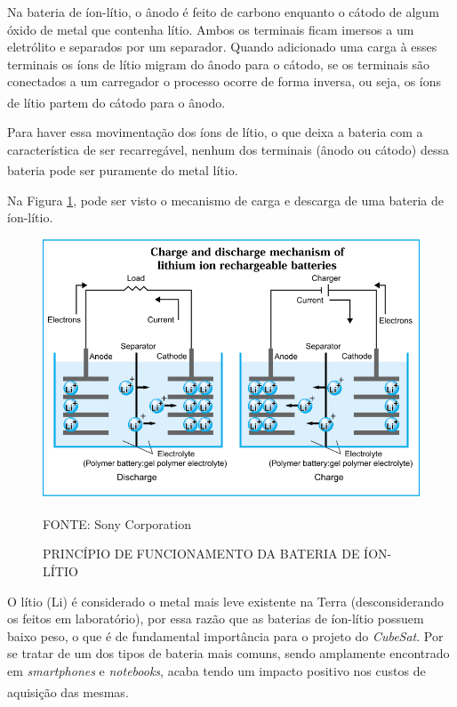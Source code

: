 \documentclass[
	12pt,				%
	openright,			%
	oneside,			%
	a4paper,			%
	english,			%
	french,				%
	spanish,			%
	brazil,				%
	oldfontcommands
	]{abntex2}
\begin{document}
	Na bateria de íon-lítio, o ânodo é feito de carbono enquanto o cátodo de algum óxido de metal que contenha lítio. Ambos os terminais ficam imersos a um eletrólito e separados por um separador. Quando adicionado uma carga à esses terminais os íons de lítio migram do ânodo para o cátodo, se os terminais são conectados a um carregador o processo ocorre de forma inversa,  ou seja, os íons de lítio partem do cátodo para o ânodo.\textsuperscript{\cite{sony}}
	
	Para haver essa movimentação dos íons de lítio, o que deixa a bateria com a característica de ser recarregável, nenhum dos terminais (ânodo ou cátodo) dessa bateria pode ser puramente do metal lítio.\textsuperscript{\cite{sony}}
	
	Na Figura \ref{Fig_PF_Bat}, pode ser visto o mecanismo de carga e descarga de uma bateria de íon-lítio.
	
	\begin{figure}[th]
		\caption{PRINCÍPIO DE FUNCIONAMENTO DA BATERIA DE ÍON-LÍTIO}
		\label{Fig_PF_Bat}
		\centering
		\includegraphics[width=0.8\linewidth]{./figs/funcionamento_bateria}
			
		\begin{small}
			FONTE: Sony Corporation\textsuperscript{\cite{sony}}
		\end{small}		
	\end{figure}
	\pagebreak
	O lítio (Li) é considerado o metal mais leve existente na Terra (desconsiderando os feitos em laboratório), por essa razão que as baterias de íon-lítio possuem baixo peso, o que é de fundamental importância para o projeto do \textit{CubeSat}. Por se tratar de um dos tipos de bateria mais comuns, sendo amplamente encontrado em \textit{smartphones} e \textit{notebooks}, acaba tendo um impacto positivo nos custos de aquisição das mesmas.\textsuperscript{\cite{TecMundo}}
	
\end{document}
